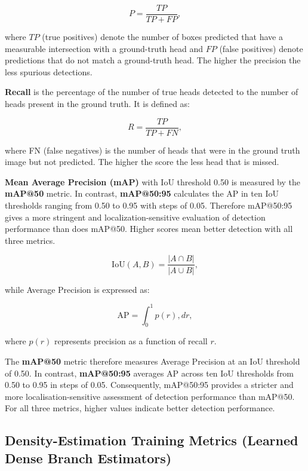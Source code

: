 \begin{equation}
P = \frac{TP}{TP + FP},
\end{equation}

where $TP$ (true positives) denote the number of boxes predicted that have a measurable intersection with a ground-truth head and $FP$ (false positives) denote predictions that do not match a ground-truth head. The higher the precision the less spurious detections.

\textbf{Recall} is the percentage of the number of true heads detected to the number of heads present in the ground truth. It is defined as:

\begin{equation}
R = \frac{TP}{TP + FN},
\end{equation}

where FN (false negatives) is the number of heads that were in the ground truth image but not predicted. The higher the score the less head that is missed.

\textbf{Mean Average Precision (mAP)} with IoU threshold 0.50 is measured by the \textbf{mAP@50} metric. In contrast, \textbf{mAP@50:95} calculates the AP in ten IoU thresholds ranging from 0.50 to 0.95 with steps of 0.05. Therefore mAP@50:95 gives a more stringent and localization-sensitive evaluation of detection performance than does mAP@50. Higher scores mean better detection with all three metrics.

\begin{equation}
\text{IoU}(A,B) = \frac{|A \cap B|}{|A \cup B|},
\end{equation}

while Average Precision is expressed as:

\begin{equation}
\text{AP} = \int_0^1 p(r),dr,
\end{equation}

where $p(r)$ represents precision as a function of recall $r$.

The \textbf{mAP@50} metric therefore measures Average Precision at an IoU threshold of 0.50. In contrast, \textbf{mAP@50:95} averages AP across ten IoU thresholds from 0.50 to 0.95 in steps of 0.05. Consequently, mAP@50:95 provides a stricter and more localisation-sensitive assessment of detection performance than mAP@50. For all three metrics, higher values indicate better detection performance.

\subsection{Density-Estimation Training Metrics (Learned Dense Branch Estimators)}

